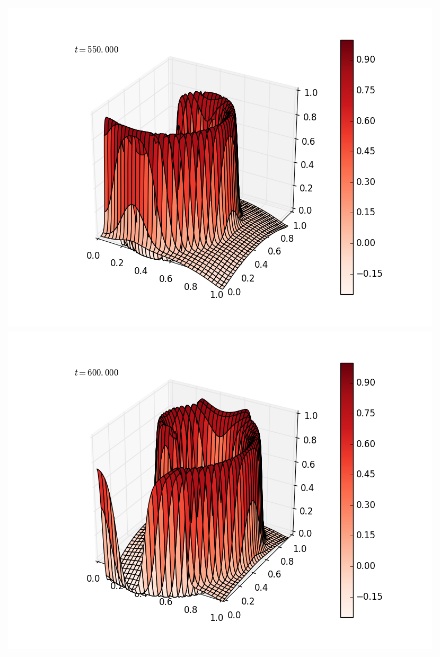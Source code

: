 \documentclass[12pt]{article}
\begin{document}
\begin{figure}[H]
\includegraphics[scale=0.4]{partc_fast_frames/partc_fast_fig25.png}
\includegraphics[scale=0.4]{partc_fast_frames/partc_fast_fig27.png}
\end{figure}
\newpage
\end{document}
